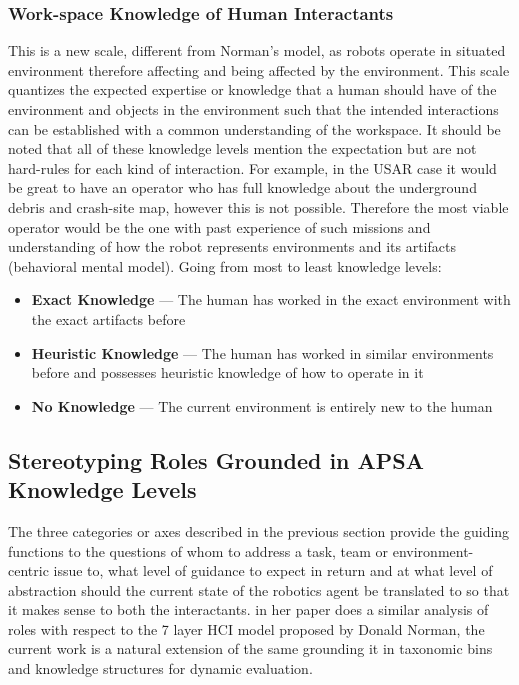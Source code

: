 \documentclass[letterpaper, 10 pt, conference]{ieeeconf} %
\theoremstyle{definition} \newtheorem{definition}{Definition}
\begin{document}
\subsubsection{Work-space Knowledge of Human Interactants}
This is a new scale, different from Norman's model, as robots operate in
situated environment therefore affecting and being affected by the environment.
This scale quantizes the expected expertise or knowledge that a human should
have of the environment and objects in the environment such that the intended
interactions can be established with a common understanding of the workspace. It
should be noted that all of these knowledge levels mention the expectation but
are not hard-rules for each kind of interaction. For example, in the USAR case
it would be great to have an operator who has full knowledge about the
underground debris and crash-site map, however this is not possible. Therefore
the most viable operator would be the one with past experience of such missions
and understanding of how the robot represents environments and its artifacts
(behavioral mental model). Going from most to least knowledge levels:
\begin{itemize}{}
  \item \textbf{Exact Knowledge} --- The human has worked in the exact
    environment with the exact artifacts before
  \item \textbf{Heuristic Knowledge} --- The human has worked in similar
    environments before and possesses heuristic knowledge of how to operate in
    it
  \item \textbf{No Knowledge} --- The current environment is entirely new to the
    human

\end{itemize}

\subsection{Stereotyping Roles Grounded in APSA Knowledge Levels}

The three categories or axes described in the previous section provide the
guiding functions to the questions of whom to address a task, team or
environment-centric issue to, what level of guidance to expect in return and at
what level of abstraction should the current state of the robotics agent be
translated to so that it makes sense to both the interactants.
\citeauthor{Scholtz2003} in her \citeyear{Scholtz2003} paper does a similar
analysis of roles with respect to the 7 layer HCI model proposed by Donald
Norman, the current work is a natural extension of the same grounding it in
taxonomic bins and knowledge structures for dynamic evaluation.
\end{document}
